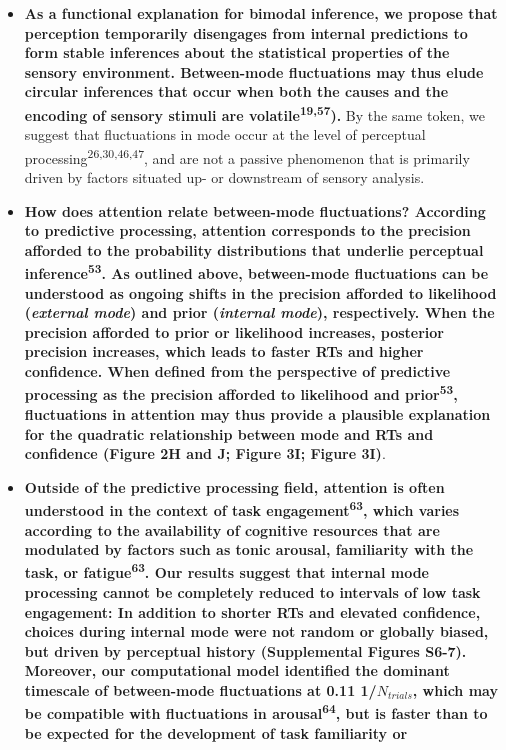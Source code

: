 \documentclass[
]{article}
\begin{document}
\begin{itemize}
\item
  \textbf{As a functional explanation for bimodal inference, we propose
  that perception temporarily disengages from internal predictions to
  form stable inferences about the statistical properties of the sensory
  environment. Between-mode fluctuations may thus elude circular
  inferences that occur when both the causes and the encoding of sensory
  stimuli are volatile\textsuperscript{19,57}).} By the same token, we
  suggest that fluctuations in mode occur at the level of perceptual
  processing\textsuperscript{26,30,46,47}, and are not a passive
  phenomenon that is primarily driven by factors situated up- or
  downstream of sensory analysis.
\item
  \textbf{How does attention relate between-mode fluctuations? According
  to predictive processing, attention corresponds to the precision
  afforded to the probability distributions that underlie perceptual
  inference\textsuperscript{53}. As outlined above, between-mode
  fluctuations can be understood as ongoing shifts in the precision
  afforded to likelihood (\emph{external mode}) and prior
  (\emph{internal mode}), respectively. When the precision afforded to
  prior or likelihood increases, posterior precision increases, which
  leads to faster RTs and higher confidence. When defined from the
  perspective of predictive processing as the precision afforded to
  likelihood and prior\textsuperscript{53}, fluctuations in attention
  may thus provide a plausible explanation for the quadratic
  relationship between mode and RTs and confidence (Figure 2H and J;
  Figure 3I; Figure 3I)}.
\item
  \textbf{Outside of the predictive processing field, attention is often
  understood in the context of task engagement\textsuperscript{63},
  which varies according to the availability of cognitive resources that
  are modulated by factors such as tonic arousal, familiarity with the
  task, or fatigue\textsuperscript{63}. Our results suggest that
  internal mode processing cannot be completely reduced to intervals of
  low task engagement: In addition to shorter RTs and elevated
  confidence, choices during internal mode were not random or globally
  biased, but driven by perceptual history (Supplemental Figures S6-7).
  Moreover, our computational model identified the dominant timescale of
  between-mode fluctuations at 0.11 1/\(N_{trials}\), which may be
  compatible with fluctuations in arousal\textsuperscript{64}, but is
  faster than to be expected for the development of task familiarity or
}
\end{itemize}
\end{document}
